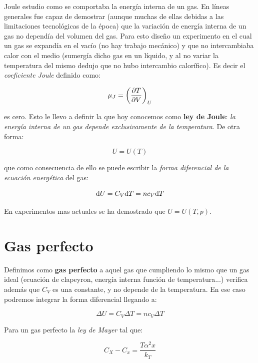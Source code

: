 \documentclass[12pt]{book}
\begin{document}
Joule estudio como se comportaba la energía interna de un gas. En líneas generales fue capaz de demostrar (aunque muchas de ellas debidas a las limitaciones tecnológicas de la época) que la variación de energía interna de un gas no dependía del volumen del gas. Para esto diseño un experimento en el cual un gas se expandía en el vacío (no hay trabajo mecánico) y que no intercambiaba calor con el medio (sumergía dicho gas en un líquido, y al no variar la temperatura del mismo dedujo que no hubo intercambio calorífico). Es decir el \textit{coeficiente Joule} definido como:

\begin{equation}
\mu_J = \left( \frac{\partial T}{\partial V} \right)_U
\end{equation}

es cero. Esto le llevo a definir la que hoy conocemos como \textbf{ley de Joule}: \textit{la energía interna de un gas depende exclusivamente de la temperatura}. De otra forma:

\begin{equation}
U = U(T)
\end{equation}

que como consecuencia de ello se puede escribir la \textit{forma diferencial de la ecuación energética} del gas:

\begin{equation}
\mathrm{d} U = C_V \mathrm{d} T = n c_V \mathrm{d} T
\end{equation}

En experimentos mas actuales se ha demostrado que $U=U(T,p)$. 

\section{Gas perfecto}

Definimos como \textbf{gas perfecto} a aquel gas que cumpliendo lo mismo que un gas ideal (ecuación de clapeyron, energía interna función de temperatura...) verifica además que $C_V$ es una constante, y no depende de la temperatura. En ese caso podremos integrar la forma diferencial llegando a:

\begin{equation}
\Delta U = C_V \Delta T = n c_V \Delta T
\end{equation}

Para un gas perfecto la \textit{ley de Mayer} tal que:

\begin{equation}
C_X - C_x = \dfrac{T \alpha^2 x}{k_T} 
\end{equation}
\end{document}
